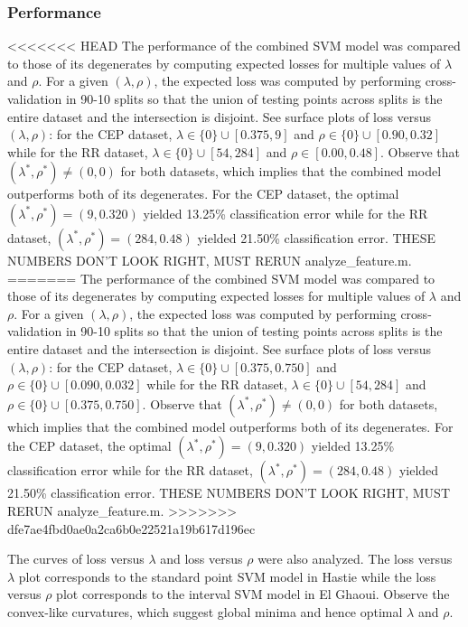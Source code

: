 \documentclass[10pt]{article}
\theoremstyle{definition}
\begin{document}
\subsubsection{Performance}
<<<<<<< HEAD
The performance of the combined SVM model was compared to those of its degenerates by computing expected losses for multiple values of $\lambda$ and $\rho$.  For a given $(\lambda,\rho)$, the expected loss was computed by performing cross-validation in 90-10 splits so that the union of testing points across splits is the entire dataset and the intersection is disjoint. See surface plots of loss versus $(\lambda,\rho)$: for the CEP dataset, $\lambda\in \lbrace 0\rbrace\cup [0.375,9]$ and $\rho\in\lbrace 0\rbrace\cup [0.90,0.32]$ while for the RR dataset, $\lambda\in\lbrace 0\rbrace\cup [54,284]$ and $\rho\in[0.00,0.48]$. Observe that $(\lambda^*,\rho^*)\neq (0,0)$ for both datasets, which implies that the combined model outperforms both of its degenerates. For the CEP dataset, the optimal $(\lambda^*,\rho^*)=(9,0.320)$ yielded 13.25\% classification error while for the RR dataset, $(\lambda^*,\rho^*)=(284,0.48)$ yielded 21.50\% classification error. THESE NUMBERS DON'T LOOK RIGHT, MUST RERUN analyze_feature.m.
=======
The performance of the combined SVM model was compared to those of its degenerates by computing expected losses for multiple values of $\lambda$ and $\rho$.  For a given $(\lambda,\rho)$, the expected loss was computed by performing cross-validation in 90-10 splits so that the union of testing points across splits is the entire dataset and the intersection is disjoint. See surface plots of loss versus $(\lambda,\rho)$: for the CEP dataset, $\lambda\in \lbrace 0\rbrace\cup [0.375,0.750]$ and $\rho\in\lbrace 0\rbrace\cup [0.090,0.032]$ while for the RR dataset, $\lambda\in\lbrace 0\rbrace\cup [54,284]$ and $\rho\in\lbrace 0\rbrace\cup [0.375,0.750]$. Observe that $(\lambda^*,\rho^*)\neq (0,0)$ for both datasets, which implies that the combined model outperforms both of its degenerates. For the CEP dataset, the optimal $(\lambda^*,\rho^*)=(9,0.320)$ yielded 13.25\% classification error while for the RR dataset, $(\lambda^*,\rho^*)=(284,0.48)$ yielded 21.50\% classification error. THESE NUMBERS DON'T LOOK RIGHT, MUST RERUN analyze\_feature.m.
>>>>>>> dfe7ae4fbd0ae0a2ca6b0e22521a19b617d196ec

The curves of loss versus $\lambda$ and loss versus $\rho$ were also analyzed.  The loss versus $\lambda$ plot corresponds to the standard point SVM model in Hastie while the loss versus $\rho$ plot corresponds to the interval SVM model in El Ghaoui. Observe the convex-like curvatures, which suggest global minima and hence optimal $\lambda$ and $\rho$. 
\end{document}

